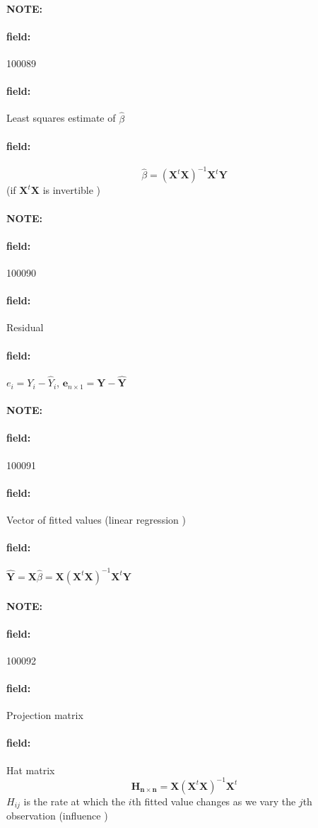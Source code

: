 \documentclass[12pt]{article}
\newenvironment{note}{\paragraph{NOTE:}}{}
\newenvironment{field}{\paragraph{field:}}{}
\begin{document}
\begin{note} \begin{field} \tiny 100089 \end{field}
 \begin{field}
  Least squares estimate of $\hat{\beta}$
 \end{field}
 \begin{field}
  $$ \hat{\beta} = (\mathbf{X}^t \mathbf{X})^{-1} \mathbf{X}^t \mathbf{Y} $$ (if $\mathbf{X}^t \mathbf{X}$ is invertible )
 \end{field}
\end{note}

\begin{note} \begin{field} \tiny 100090 \end{field}
 \begin{field}
  Residual
 \end{field}
 \begin{field}
  $e_i = Y_i - \hat{Y}_i$, $\mathbf{e}_{n\times 1} = \mathbf{Y} - \hat{\mathbf{Y}}$
 \end{field}
\end{note}

\begin{note} \begin{field} \tiny 100091 \end{field}
 \begin{field}
  Vector of fitted values (linear regression )
 \end{field}
 \begin{field}
  $\hat{\mathbf{Y}} = \mathbf{X}\hat{\beta} = \mathbf{X} (\mathbf{X}^t \mathbf{X})^{-1} \mathbf{X}^t \mathbf{Y}$
 \end{field}
\end{note}

\begin{note} \begin{field} \tiny 100092 \end{field}
 \begin{field}
  Projection matrix
 \end{field}
 \begin{field}
  Hat matrix
  $$\mathbf{H_{n \times n}} = \mathbf{X} (\mathbf{X}^t \mathbf{X})^{-1} \mathbf{X}^t$$
  $H_{ij}$ is the rate at which the $i$th fitted value changes as we vary the $j$th observation (influence )
 \end{field}
\end{note}
\end{document}
